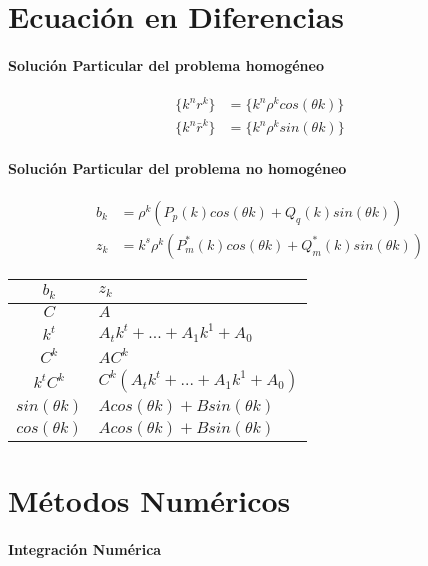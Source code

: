 \documentclass{article}
\begin{document}
\begin{multicols}{2}
    \section{Ecuación en Diferencias}

      \paragraph{Solución Particular del problema homogéneo}

        \begin{align*}
          \{k^nr^k \}&= \{k^n\rho^k cos(\theta k)\}\\
          \{k^n\bar{r}^k \} &=\{k^n\rho^k sin(\theta k)\}
        \end{align*}

      \paragraph{Solución Particular del problema no homogéneo}

        \begin{align*}
          b_k &= \rho^k(P_p(k) cos(\theta k) + Q_q(k) sin(\theta k ))\\
          z_k &= k^s\rho^k(P^*_m(k) cos(\theta k) + Q^*_m(k) sin(\theta k ))
        \end{align*}

        \begin{tabular}{c | l}
          $b_k$ & $z_k$ \\ \hline
          $C$ & $A$ \\
          $k^t$ & $A_tk^t + ... + A_1k^1 + A_0$ \\
          $C^k$ & $AC^k$ \\
          $k^tC^k$ & $C^k(A_tk^t + ... + A_1k^1 + A_0)$\\
          $sin(\theta k)$ & $Acos(\theta k) + Bsin(\theta k)$ \\
          $cos(\theta k)$ & $Acos(\theta k) + Bsin(\theta k)$
        \end{tabular}


    \section{Métodos Numéricos}

      \paragraph{Integración Numérica}


\end{multicols}
\end{document}
